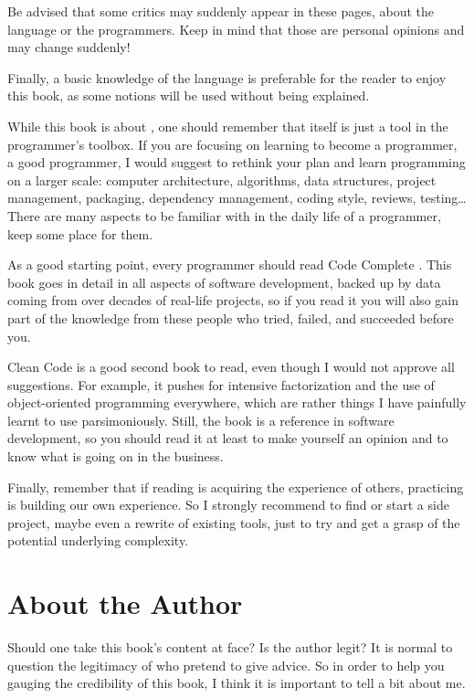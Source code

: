 Be advised that some critics may suddenly appear in these pages, about
the language or the programmers. Keep in mind that those are personal
opinions and may change suddenly!

Finally, a basic knowledge of the language is preferable for the
reader to enjoy this book, as some notions will be used without being
explained.

\bigskip

While this book is about \cpp, one should remember that \cpp{} itself
is just a tool in the programmer's toolbox. If you are focusing on
learning \cpp{} to become a programmer, a good programmer, I would
suggest to rethink your plan and learn programming on a larger scale:
computer architecture, algorithms, data structures, project
management, packaging, dependency management, coding style, reviews,
testing…  There are many aspects to be familiar with in the daily life
of a programmer, keep some place for them.

As a good starting point, every programmer should read Code Complete
\cite{code-complete}. This book goes in detail in all aspects of
software development, backed up by data coming from over decades of
real-life projects, so if you read it you will also gain part of the
knowledge from these people who tried, failed, and succeeded before
you.

Clean Code \cite{clean-code} is a good second book to read, even
though I would not approve all suggestions. For example, it pushes for
intensive factorization and the use of object-oriented programming
everywhere, which are rather things I have painfully learnt to use
parsimoniously. Still, the book is a reference in software
development, so you should read it at least to make yourself an
opinion and to know what is going on in the business.

\bigskip

Finally, remember that if reading is acquiring the experience of
others, practicing is building our own experience. So I strongly
recommend to find or start a side project, maybe even a rewrite of
existing tools, just to try and get a grasp of the potential underlying
complexity.

\section{About the Author}

Should one take this book's content at face? Is the author legit? It
is normal to question the legitimacy of who pretend to give advice.
So in order to help you gauging the credibility of this book, I think
it is important to tell a bit about me.

